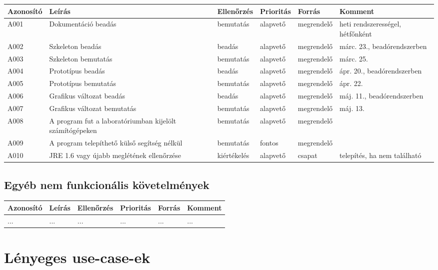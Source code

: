 \begin{tabularx}{\linewidth}{| l | X | l | l | l | X |}
\hline
\textbf{Azonosító}   & \textbf{Leírás} & \textbf{Ellenőrzés} & \textbf{Prioritás} & \textbf{Forrás} & \textbf{Komment} \tabularnewline
\hline\hline
\endhead
A001 & Dokumentáció beadás & bemutatás & alapvető & megrendelő & heti rendszerességel, hétfőnként \tabularnewline \hline
A002 & Szkeleton beadás & beadás & alapvető & megrendelő & márc. 23., beadórendszerben \tabularnewline \hline
A003 & Szkeleton bemutatás & bemutatás & alapvető & megrendelő & márc. 25. \tabularnewline \hline
A004 & Prototípus beadás & beadás & alapvető & megrendelő & ápr. 20., beadórendszerben \tabularnewline \hline
A005 & Prototípus bemutatás & bemutatás & alapvető & megrendelő & ápr. 22.  \tabularnewline \hline
A006 & Grafikus változat beadás & beadás & alapvető & megrendelő & máj. 11., beadórendszerben  \tabularnewline \hline
A007 & Grafikus változat bemutatás & bemutatás & alapvető & megrendelő & máj. 13. \tabularnewline \hline
A008 & A program fut a laboratóriumban kijelölt számítógépeken & bemutatás & alapvető & megrendelő & \tabularnewline \hline
A009 & A program telepíthető külső segítség nélkül & bemutatás & fontos & megrendelő & \tabularnewline \hline
A010 & JRE 1.6 vagy újabb meglétének ellenőrzése & kiértékelés & alapvető & csapat & telepítés, ha nem található \tabularnewline \hline
\end{tabularx}

\subsection{Egyéb nem funkcionális követelmények}

\begin{tabularx}{\linewidth}{| l | l | l | l | l | l |}
\hline
\textbf{Azonosító}   & \textbf{Leírás} & \textbf{Ellenőrzés} & \textbf{Prioritás} & \textbf{Forrás} & \textbf{Komment} \tabularnewline
\hline\hline
... & ... & ... & ... & ... & ... \tabularnewline
\hline
\end{tabularx}


\section{Lényeges use-case-ek}
